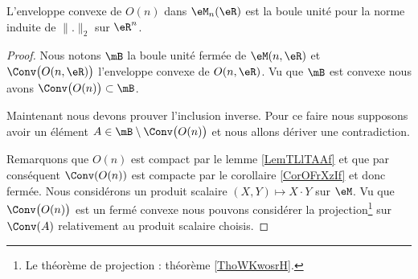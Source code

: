 \begin{theorem} \label{ThoVBzqUpy}
    L'enveloppe convexe de \( O(n)\) dans \( \eM_n(\eR)\) est la boule unité pour la norme induite de \( \| . \|_2\) sur \( \eR^n\).
\end{theorem}

\begin{proof}
    Nous notons \( \mB\) la boule unité fermée de \( \eM(n,\eR)\) et \( \Conv\big( O(n,\eR) \big)\) l'enveloppe convexe de \( O(n,\eR)\). Vu que \( \mB\) est convexe nous avons \( \Conv\big( O(n) \big)\subset\mB\).


    Maintenant nous devons prouver l'inclusion inverse. Pour ce faire nous supposons avoir un élément \( A\in \mB\setminus\Conv\big( O(n) \big)\) et nous allons dériver une contradiction.
    
    Remarquons que \( O(n)\) est compact par le lemme \ref{LemTLlTAAf} et que par conséquent \( \Conv(O(n))\) est compacte par le corollaire \ref{CorOFrXzIf} et donc fermée. Nous considérons un produit scalaire \( (X,Y)\mapsto X\cdot Y\) sur \( \eM\). Vu que \( \Conv\big( O(n) \big)\) est un fermé convexe nous pouvons considérer la projection\footnote{Le théorème de projection : théorème \ref{ThoWKwosrH}.} sur \( \Conv(A)\) relativement au produit scalaire choisis.


\end{proof}
